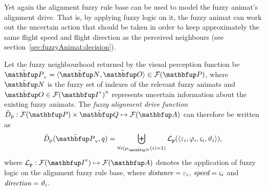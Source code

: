 Yet again the alignment fuzzy rule base can be used to model the fuzzy animat's alignment drive. That is, by applying fuzzy logic on it, the fuzzy animat can work out the uncertain action that should be taken in order to keep approximately the same flight speed and flight direction as the perceived neighbours (see section~\ref{sec:fuzzyAnimat:decision}).

\begin{definition}
\label{def:fuzzyAnimat:Dp:afd} 
Let the fuzzy neighbourhood returned by the visual perception function be $\fset{P}_\textnormal{v}=\langle \fset{N}, \fset{O} \rangle \in \fpowset{\set{P}}$, where $\fset{N}$ is the fuzzy set of indexes of the relevant fuzzy animats and $\fset{O} \in \fpowset{\set{I}^\textnormal{v}}^n$ represents uncertain information about the existing fuzzy animats. The \emph{fuzzy alignment drive function} $\ffunc{D}_\textnormal{p}: \fpowset{\set{P}} \times \fset{Q} \mapsto \fpowset{\set{A}}$ can therefore be written as
\begin{equation}
\ffunc{D}_\textnormal{p}(\fset{P}_\textnormal{v},q)=%
 \biguplus_{\forall i(\mu_\fset{N}(i)=1)} \mathcal{L}_\texttt{p}(\langle \varepsilon_i, \varphi_i, \varsigma_i, \vartheta_i \rangle),
\end{equation}
where $\mathcal{L}_\texttt{p}: \fpowset{\set{I}^\textnormal{v}} \mapsto \fpowset{\set{A}}$ denotes the application of fuzzy logic on the alignment fuzzy rule base, where $\emph{distance}=\varepsilon_i$, $\emph{speed}=\varsigma_i$ and $\emph{direction}=\vartheta_i$.
\end{definition}

